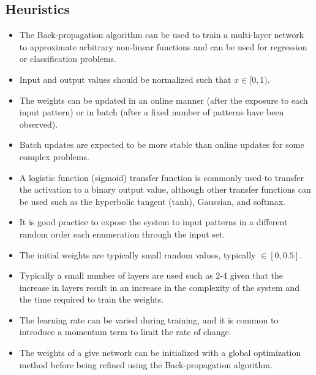 \subsection{Heuristics}
\begin{itemize}
	\item The Back-propagation algorithm can be used to train a multi-layer network to approximate arbitrary non-linear functions and can be used for regression or classification problems.
	\item Input and output values should be normalized such that $x \in [0,1)$.
	\item The weights can be updated in an online manner (after the exposure to each input pattern) or in batch (after a fixed number of patterns have been observed).
	\item Batch updates are expected to be more stable than online updates for some complex problems.
	\item A logistic function (sigmoid) transfer function is commonly used to transfer the activation to a binary output value, although other transfer functions can be used such as the hyperbolic tangent (tanh), Gaussian, and softmax.
	\item It is good practice to expose the system to input patterns in a different random order each enumeration through the input set.
	\item The initial weights are typically small random values, typically $\in [0, 0.5]$.
	\item Typically a small number of layers are used such as 2-4 given that the increase in layers result in an increase in the complexity of the system and the time required to train the weights.
	\item The learning rate can be varied during training, and it is common to introduce a momentum term to limit the rate of change.
	\item The weights of a give network can be initialized with a global optimization method before being refined using the Back-propagation algorithm.
\end{itemize}

